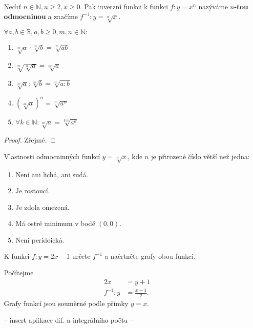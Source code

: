 \begin{definition}
    Nechť $n\in \mathbb N, n\geq 2, x \geq 0.$ Pak inverzní funkci k funkci
    $f:y=x^n$ nazýváme \textbf{$n$-tou odmocninou} a značíme $f^{-1}: y=\sqrt[n]{x}.$
\end{definition}

\begin{veta}
    $\forall a,b \in \mathbb R, a,b \geq 0, m,n \in \mathbb N:$
    \begin{enumerate}[$i.$]
        \item $\sqrt[m]{a}\cdot \sqrt[m]{b}=\sqrt[m]{ab}$
       	\item $\sqrt[m]{\sqrt[n]{a} } = \sqrt[mn]{a}$
       	\item $\sqrt[m]{a} : \sqrt[m]{b} = \sqrt[m]{a:b}$
       	\item $\left ( \sqrt[m]{a}  \right )^n = \sqrt[m]{a^n}  $
       	\item $\forall k \in \mathbb N: \sqrt[m]{a}=\sqrt[km]{a^k}$
    \end{enumerate}
\end{veta}

\begin{proof}
    Zřejmé.
\end{proof}

\begin{veta}
    Vlastnosti odmocninných funkcí $y= \sqrt[n]{x}$, kde $n$ je přirozené číslo větší
    než jedna:
    \begin{enumerate}[$i.$]
        \item Není ani lichá, ani sudá.
       	\item Je rostoucí.
        \item Je zdola omezená.
        \item Má ostré minimum v bodě $(0,0).$
        \item Není peridoická.
    \end{enumerate}
\end{veta}

\begin{priklad}
K funkci $f:y=2x-1$ určete $f^{-1}$ a načrtněte grafy obou funkcí.
\end{priklad}

\begin{reseni}
Počítejme
\begin{align*}
    2x&=y+1\\
    f^{-1}:y &= \frac{x+1}{2}.
\end{align*}
Grafy funkcí jsou souměrné podle přímky $y=x.$
\end{reseni}

-- insert aplikace dif. a integrálního počtu --

